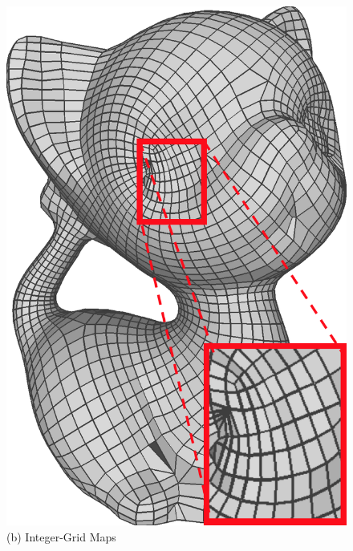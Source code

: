 \begin{figure}
\begin{minipage}{0.16\textwidth}
  \includegraphics[width=\textwidth,height=1.33\textwidth]{quadriflow/result/area01.png}\\
   (b) Integer-Grid Maps
   \end{minipage}
    \begin{minipage}{0.16\textwidth}
     \centering

\end{minipage}
\end{figure}
